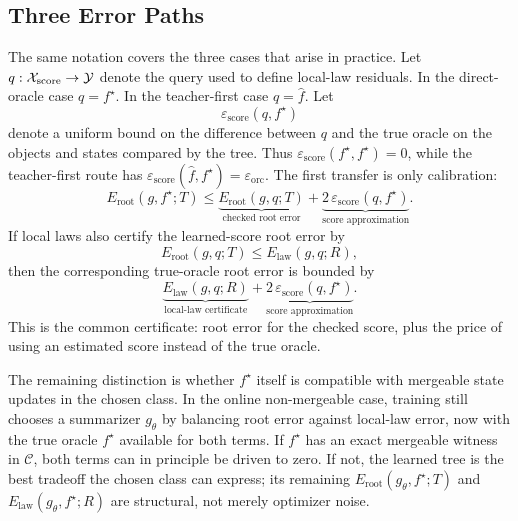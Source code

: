 \subsection{Three Error Paths}
\label{app:v7-three-error-paths}

The same notation covers the three cases that arise in practice. Let
\(q:\mathcal X_{\mathrm{score}}\to\mathcal{Y}\) denote the query used to define
local-law residuals. In the direct-oracle case \(q=f^\star\). In the
teacher-first case \(q=\widehat f\). Let
\[
  \varepsilon_{\mathrm{score}}(q,f^\star)
\]
denote a uniform bound on the difference between \(q\) and the true
oracle on the objects and states compared by the tree. Thus
\(\varepsilon_{\mathrm{score}}(f^\star,f^\star)=0\), while the
teacher-first route has
\(\varepsilon_{\mathrm{score}}(\widehat f,f^\star)=\varepsilon_{\mathrm{orc}}\).
The first transfer is only calibration:
\[
  E_{\mathrm{root}}(g,f^\star;T)
  \le
  \underbrace{E_{\mathrm{root}}(g,q;T)}
    _{\text{checked root error}}
  +
  \underbrace{2\,\varepsilon_{\mathrm{score}}(q,f^\star)}
    _{\text{score approximation}}.
\]
If local laws also certify the learned-score root error by
\[
  E_{\mathrm{root}}(g,q;T)\le E_{\mathrm{law}}(g,q;R),
\]
then the corresponding true-oracle root error is bounded by
\[
  \underbrace{E_{\mathrm{law}}(g,q;R)}
    _{\text{local-law certificate}}
  +
  \underbrace{2\,\varepsilon_{\mathrm{score}}(q,f^\star)}
    _{\text{score approximation}}.
\]
This is the common certificate: root error for the checked score, plus
the price of using an estimated score instead of the true oracle.

The remaining distinction is whether \(f^\star\) itself is compatible
with mergeable state updates in the chosen class. In the online
non-mergeable case, training still chooses a summarizer \(g_\theta\) by
balancing root error against local-law error, now with the true oracle
\(f^\star\) available for both terms.
If \(f^\star\) has an exact mergeable witness in \(\mathcal C\), both
terms can in principle be driven to zero. If not, the learned tree is
the best tradeoff the chosen class can express; its remaining
\(E_{\mathrm{root}}(g_\theta,f^\star;T)\) and
\(E_{\mathrm{law}}(g_\theta,f^\star;R)\) are structural, not merely
optimizer noise.

